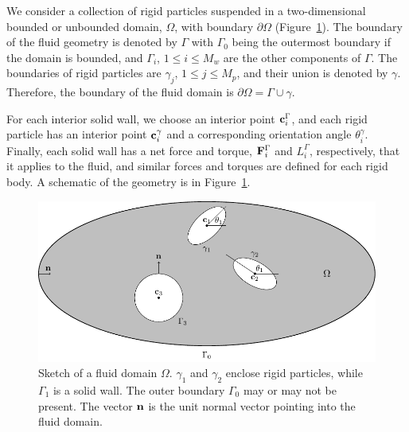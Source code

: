 \documentclass[preprint, 10pt]{elsarticle}
\begin{document}
We consider a collection of rigid particles suspended in a
two-dimensional bounded or unbounded domain, $\Omega$, with boundary
$\partial\Omega$ (Figure~\ref{fig:geomSchematic}).  The boundary of the
fluid geometry is denoted by $\Gamma$ with $\Gamma_0$ being the
outermost boundary if the domain is bounded, and $\Gamma_i$, $1\leq i
\leq M_w$ are the other components of $\Gamma$.  The boundaries of rigid
particles are $\gamma_j$, $1\leq j\leq M_p$, and their union is denoted by
$\gamma$.  Therefore, the boundary of the fluid domain is $ \partial\Omega =\Gamma \cup \gamma$.
 
For each interior solid wall, we choose an interior point
${\mathbf{c}}^\Gamma_i$, and each rigid particle has an interior point
${\mathbf{c}}^\gamma_i$ and a corresponding orientation angle $\theta^\gamma_i$.
Finally, each solid wall has a net force and torque, ${\mathbf{F}}^\Gamma_i$ and
$L^\Gamma_i$, respectively, that it applies to the fluid, and similar
forces and torques are defined for each rigid body.  A schematic of the
geometry is in Figure~\ref{fig:geomSchematic}.


%

\begin{figure}[!h]
\begin{center}
\includegraphics{figures/multiply_connected.pdf}
\end{center}
\caption{\label{fig:geomSchematic}Sketch of a fluid domain $\Omega$.
$\gamma_1$ and $\gamma_2$ enclose rigid particles, while $\Gamma_1$ is a solid
wall. The outer boundary $\Gamma_0$ may or may not be present.  The vector
${\mathbf{n}}$ is the unit normal vector pointing into the fluid domain.}
\end{figure}
\end{document}
